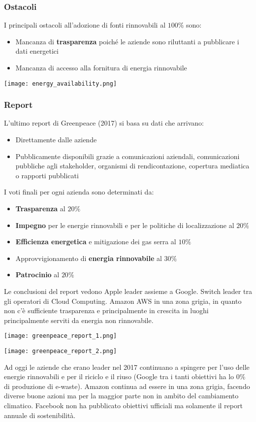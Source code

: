 \subsubsection{Ostacoli}
I principali ostacoli all'adozione di fonti rinnovabili al $100\%$ sono:
\begin{itemize}
	\item Mancanza di \textbf{trasparenza} poiché le aziende sono riluttanti a pubblicare i dati energetici
	\item Mancanza di accesso alla fornitura di energia rinnovabile
\end{itemize}
\begin{center}
	\texttt{[image: energy\_availability.png]}
\end{center}

\subsubsection{Report}
L'ultimo report di Greenpeace (2017) si basa su dati che arrivano:
\begin{itemize}
	\item Direttamente dalle aziende
	\item Pubblicamente disponibili grazie a comunicazioni aziendali, comunicazioni pubbliche agli stakeholder, organismi di rendicontazione, copertura mediatica o rapporti pubblicati
\end{itemize}
I voti finali per ogni azienda sono determinati da:
\begin{itemize}
	\item \textbf{Trasparenza} al $20\%$
	\item \textbf{Impegno} per le energie rinnovabili e per le politiche di localizzazione al $20\%$
	\item \textbf{Efficienza energetica} e mitigazione dei gas serra al $10\%$
	\item Approvvigionamento di \textbf{energia rinnovabile} al $30\%$
	\item \textbf{Patrocinio} al $20\%$
\end{itemize}
Le conclusioni del report vedono Apple leader assieme a Google. Switch leader tra gli operatori di Cloud Computing. Amazon AWS in una zona grigia, in quanto non c'è sufficiente trasparenza e principalmente in crescita in luoghi principalmente serviti da energia non rinnovabile.
\begin{center}
	\texttt{[image: greenpeace\_report\_1.png]}
\end{center}
\begin{center}
\texttt{[image: greenpeace\_report\_2.png]}
\end{center}
Ad oggi le aziende che erano leader nel 2017 continuano a spingere per l'uso delle energie rinnovabili e per il riciclo e il riuso (Google tra i tanti obiettivi ha lo $0\%$ di produzione di e-waste). Amazon continua ad essere in una zona grigia, facendo diverse buone azioni ma per la maggior parte non in ambito del cambiamento climatico. Facebook non ha pubblicato obiettivi ufficiali ma solamente il report annuale di sostenibilità.